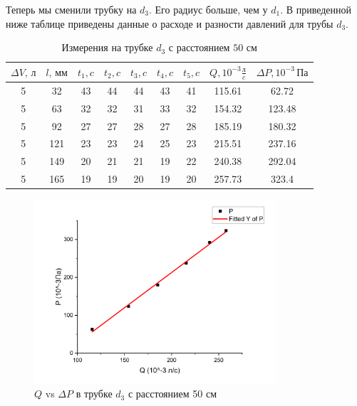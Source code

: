 \documentclass[a4paper, 12pt]{article}%
\begin{document}
Теперь мы сменили трубку на $d_3$. Его радиус больше, чем у $d_1$.  В приведенной ниже таблице приведены данные о расходе и разности давлений для трубы $d_3$.
\begin{table}[h]

	\centering
	\begin{tabular}{|c|c|c|c|c|c|c|c|c|} \hline
 $\Delta V, \, \text{л}$ &   $l,\, \text{мм}$ &     $t_1, c$ &     $t_2, c$ &     $t_3, c$ &     $t_4, c$ &     $t_5, c$&     $ Q, 10^{-3} \frac{\text{л}}{c} $ & $\Delta P, 10^{-3}\, \text{Па}$ \\\hline
5 &  32 &  43 & 44 & 44 &  43 & 41 & 115.61   &  62.72 \\\hline
5 &  63 &  32 & 32 &  31 &  33 &  32 & 154.32 & 123.48 \\\hline
5 &  92 &  27 &  27 &  28 &  27 &  28 &   185.19& 180.32 \\\hline
5 &  121 &  23 &  23 &  24 &  25 &  23 &  215.51 & 237.16   \\\hline
5 &  149 & 20 &  21 &  21 &  19 &  22 &   240.38& 292.04   \\\hline
5 &  165 & 19 &  19 &  20 &  19 &  20 &   257.73& 323.4    \\\hline
 \end{tabular}
		\caption{Измерения на трубке $d_3$ с расстоянием $50$ см}
\end{table}

\begin{figure}[h]
\begin{center}
\includegraphics[width = 0.8\textwidth]{labphoto6.png}
\caption{$Q$ vs $\Delta P$ в трубке $d_3$ с расстоянием 50 см}
\end{center}
\end{figure}
\end{document}
